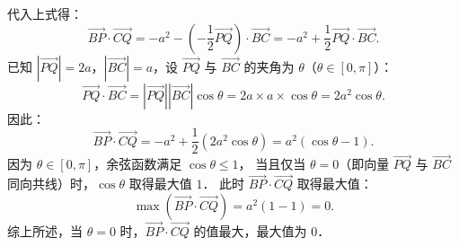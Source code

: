 \begin{answer}
代入上式得：
\nopagebreak[4]
\[
\overrightarrow{BP} \cdot \overrightarrow{CQ} = -a^2 - \left(-\frac{1}{2}\overrightarrow{PQ}\right) \cdot \overrightarrow{BC} = -a^2 + \frac{1}{2}\overrightarrow{PQ} \cdot \overrightarrow{BC}.
\]
已知 $|\overrightarrow{PQ}| = 2a$，$|\overrightarrow{BC}| = a$，设 $\overrightarrow{PQ}$ 与 $\overrightarrow{BC}$ 的夹角为 $\theta$（$\theta \in [0, \pi]$）：
\nopagebreak[4]
\[
\overrightarrow{PQ} \cdot \overrightarrow{BC} = |\overrightarrow{PQ}||\overrightarrow{BC}|\cos\theta = 2a \times a \times \cos\theta = 2a^2 \cos\theta.
\]
因此：
\nopagebreak[4]
\[
\overrightarrow{BP} \cdot \overrightarrow{CQ} = -a^2 + \frac{1}{2}(2a^2 \cos\theta) = a^2(\cos\theta - 1).
\]
因为 $\theta \in [0, \pi]$，余弦函数满足 $\cos\theta \leqslant 1$，
当且仅当 $\theta = 0$（即向量 $\overrightarrow{PQ}$ 与 $\overrightarrow{BC}$ 同向共线）时，$\cos\theta$ 取得最大值 $1$．
此时 $\overrightarrow{BP} \cdot \overrightarrow{CQ}$ 取得最大值：
\nopagebreak[4]
\[
\max \left(\overrightarrow{BP} \cdot \overrightarrow{CQ}\right) = a^2(1 - 1) = 0.
\]
综上所述，当 $\theta = 0$ 时，$\overrightarrow{BP} \cdot \overrightarrow{CQ}$ 的值最大，最大值为 $0$．


\end{answer}
